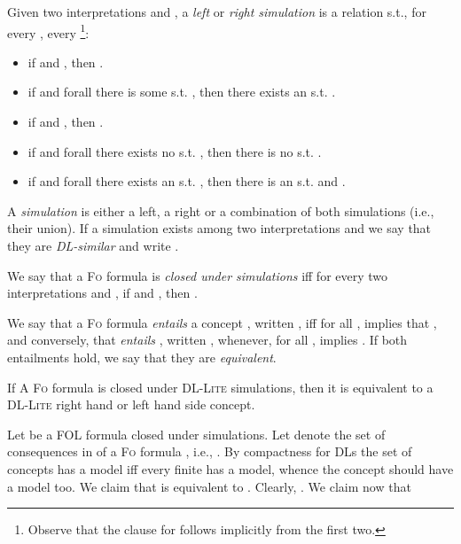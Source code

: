 \documentclass[11pt]{llncs}
\newcommand{\logic}[1]{\textsc{#1}\xspace}
\newcommand{\FOL}{\logic{Fo}}
\newcommand{\g}[1]{\logic{#1}}
\begin{document}
Given two interpretations  and , a 
{\em  left}  or {\em right simulation}  
is a relation  s.t., for every , every
\footnote{Observe that the clause for  follows implicitly from the first two.}:
\begin{itemize}
\item if  and , then .
\item if  and forall  there is some  
s.t. , then there exists an  s.t.
.
\item if  and , then .
\item if  and forall  there exists no  s.t. 
, then there is no  s.t.
.
\item if  and forall  there exists an  s.t. 
, then there is an  s.t.
 and .
\end{itemize}

A {\em  simulation}  is either a left, a
right or a combination of both simulations (i.e., their union). 
If a  simulation  exists
among two interpretations  and  we say that
they are {\em DL-similar} and write .

We say that a \FOL formula  is {\em closed under 
simulations} iff for every two interpretations  and ,
if  and , then .

We say that a \FOL formula  {\em entails} 
a  concept ,
written ,
iff for all ,  implies
that , and conversely, that
 {\em entails} , written , whenever, for all
,  implies .
If both entailments hold, we say that they are {\em equivalent}.

\begin{lemma}
If A \FOL formula  is closed
under \g{DL-Lite} simulations, then it is 
equivalent to a \g{DL-Lite}
right hand or left hand side concept.
\end{lemma}

\proof Let  be a \g{FOL} formula closed under
 simulations. Let  denote the set of consequences in 
 of 
a \FOL formula , i.e., . 
By compactness for DLs \cite{DLHandbook} the set of concepts
 has a model iff every finite  
has a model, whence
the concept  should have a model too.
We claim that  is equivalent to . Clearly,
. We claim now that
\end{document}
